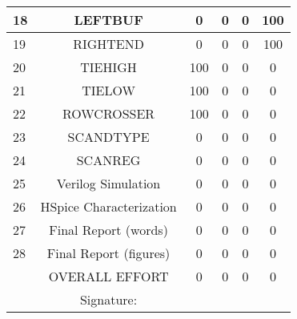 \begin{table}[htb!]
\begin{tabular}{|p{1cm}|c|c|c|c|c|}
18&LEFTBUF						&	0	&	0	&	0	&	100	\\ \hline
19&RIGHTEND						&	0	&	0	&	0	&	100	\\ \hline
20&TIEHIGH						&	100	&	0	&	0	&	0	\\ \hline
21&TIELOW						&	100	&	0	&	0	&	0	\\ \hline
22&ROWCROSSER					&	100	&	0	&	0	&	0	\\ \hline
23&SCANDTYPE					&	0	&	0	&	0	&	0	\\ \hline
24&SCANREG						&	0	&	0	&	0	&	0	\\ \hline
25&Verilog Simulation			&	0	&	0	&	0	&	0	\\ \hline
26&HSpice Characterization		&	0	&	0	&	0	&	0	\\ \hline
27& Final Report (words)		&	0	&	0	&	0	&	0	\\ \hline
28& Final Report (figures)		&	0	&	0	&	0	&	0	\\ \hline
& OVERALL EFFORT 				&	0	&	0	&	0	&	0	\\ \hline
& Signature: 					& 		& 		& 		&		\\ \hline
\end{tabular}
\end{table}